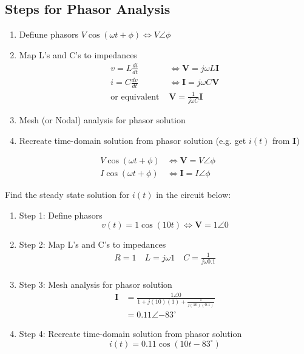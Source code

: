\subsection*{Steps for Phasor Analysis}
\begin{enumerate}
    \item Defiune phasors $V\cos(\omega t + \phi) \iff V\angle{\phi}$
    \item Map L's and C's to impedances \begin{align}
              v  = L\frac{di}{dt}   & \iff \textbf{V} = j\omega L \textbf{I}      \\
              i = C\frac{dv}{dt}    & \iff \textbf{I} = j\omega C \textbf{V}      \\
              \text{or equivalent } & \textbf{V} = \frac{1}{j\omega C} \textbf{I}
          \end{align}
    \item Mesh (or Nodal) analysis for phasor solution
    \item Recreate time-domain solution from phasor solution (e.g. get $i(t)$ from $\textbf{{I}}$)
\end{enumerate}

\begin{observation}
    \begin{align}
        V\cos(\omega t + \phi) & \iff \textbf{V} = V\angle{\phi} \\
        I\cos(\omega t + \phi) & \iff \textbf{I} = I\angle{\phi}
    \end{align}
\end{observation}

\begin{example}
    [Example 2]
    Find the steady state solution for $i(t)$ in the circuit below:

    \begin{enumerate}
        \item Step 1: Define phasors
              \[                  v(t) = 1\cos(10 t) \iff \textbf{V} = 1\angle{0}
              \]
        \item Step 2: Map L's and C's to impedances \begin{align}
                  R = 1 \quad L = j\omega 1 \quad C = \frac{1}{j\omega 0.1} \\
              \end{align}
        \item Step 3: Mesh analysis for phasor solution
              \begin{align}
                  \textbf{I} & = \frac{1\angle{0}}{1 + j(10)(1) + \frac{1}{j(10)(0.1)}} \\
                             & = 0.11 \angle{-83^\circ}
              \end{align}
        \item Step 4: Recreate time-domain solution from phasor solution \[i(t) = 0.11\cos(10t - 83^\circ)\]
    \end{enumerate}
\end{example}

